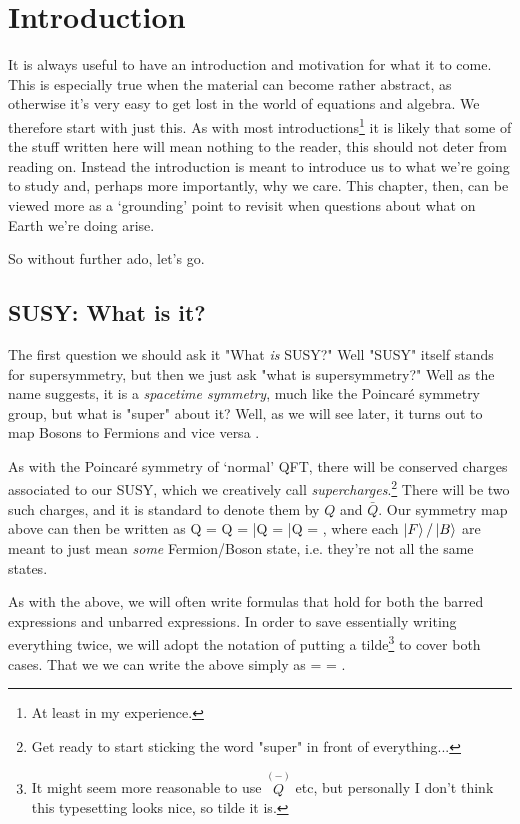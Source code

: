 \chapter{Introduction}

It is always useful to have an introduction and motivation for what it to come. This is especially true when the material can become rather abstract, as otherwise it's very easy to get lost in the world of equations and algebra. We therefore start with just this. As with most introductions\footnote{At least in my experience.} it is likely that some of the stuff written here will mean nothing to the reader, this should not deter from reading on. Instead the introduction is meant to introduce us to what we're going to study and, perhaps more importantly, why we care. This chapter, then, can be viewed more as a `grounding' point to revisit when questions about what on Earth we're doing arise. 

So without further ado, let's go. 

\section{SUSY: What is it?}
\label{sec:WhatIsSUSY}

The first question we should ask it "What \textit{is} SUSY?" Well "SUSY" itself stands for supersymmetry, but then we just ask "what is supersymmetry?" Well as the name suggests, it is a \textit{spacetime symmetry}, much like the Poincar\'{e} symmetry group, but what is "super" about it? Well, as we will see later, it turns out to map Bosons to Fermions and vice versa
\bse
      \qquad \Longleftrightarrow \qquad {} .
\ese

As with the Poincar\'{e} symmetry of `normal' QFT, there will be conserved charges associated to our SUSY, which we creatively call \textit{supercharges}.\footnote{Get ready to start sticking the word "super" in front of everything...} There will be two such charges, and it is standard to denote them by $Q$ and $\bar{Q}$. Our symmetry map above can then be written as 
\bse 
    Q =  \qquad Q  =  \qquad \bar{Q} =  \qand \bar{Q} = ,
\ese 
where each $\ket{F}/\ket{B}$ are meant to just mean \textit{some} Fermion/Boson state, i.e. they're not all the same states. 

\bnn 
    As with the above, we will often write formulas that hold for both the barred expressions and unbarred expressions. In order to save essentially writing everything twice, we will adopt the notation of putting a tilde\footnote{It might seem more reasonable to use $\overset{(-)}{Q}$ etc, but personally I don't think this typesetting looks nice, so tilde it is.} to cover both cases. That we we can write the above simply as
    \be 
    \label{eqn:QOnBAndF}
         =  \qand {} = . 
    \ee 
\enn 

